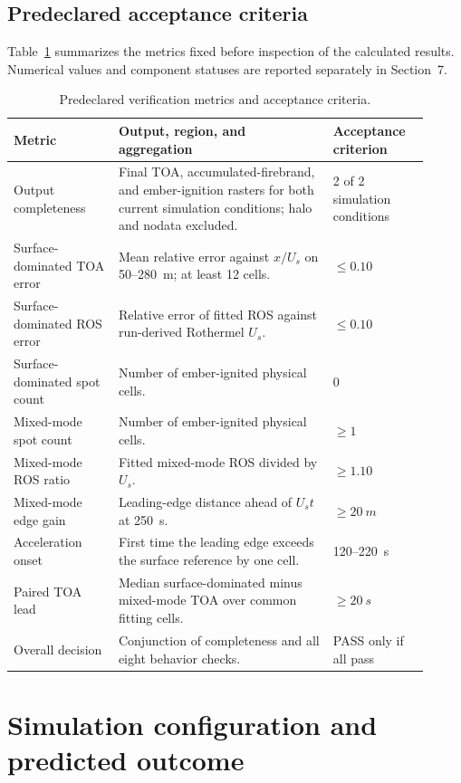 \subsection{Predeclared acceptance criteria}

Table~\ref{tab:acceptance-contract} summarizes the metrics fixed before
inspection of the calculated results. Numerical values and component statuses
are reported separately in Section~7.

\begin{table}[H]
\centering
\footnotesize
\caption{Predeclared verification metrics and acceptance criteria.}
\label{tab:acceptance-contract}
\begin{tabular}{@{}p{0.23\linewidth}p{0.47\linewidth}p{0.21\linewidth}@{}}
\toprule
Metric & Output, region, and aggregation & Acceptance criterion\\
\midrule
Output completeness & Final TOA, accumulated-firebrand, and ember-ignition rasters for both current simulation conditions; halo and nodata excluded. & 2 of 2 simulation conditions \\
Surface-dominated TOA error & Mean relative error against \(x/U_s\) on 50--\SI{280}{m}; at least 12 cells. & \(\le0.10\) \\
Surface-dominated ROS error & Relative error of fitted ROS against run-derived Rothermel \(U_s\). & \(\le0.10\) \\
Surface-dominated spot count & Number of ember-ignited physical cells. & 0 \\
Mixed-mode spot count & Number of ember-ignited physical cells. & \(\ge1\) \\
Mixed-mode ROS ratio & Fitted mixed-mode ROS divided by \(U_s\). & \(\ge1.10\) \\
Mixed-mode edge gain & Leading-edge distance ahead of \(U_st\) at \SI{250}{s}. & \(\ge\SI{20}{m}\) \\
Acceleration onset & First time the leading edge exceeds the surface reference by one cell. & 120--\SI{220}{s} \\
Paired TOA lead & Median surface-dominated minus mixed-mode TOA over common fitting cells. & \(\ge\SI{20}{s}\) \\
Overall decision & Conjunction of completeness and all eight behavior checks. & PASS only if all pass \\
\bottomrule
\end{tabular}
\end{table}

\section{Simulation configuration and predicted outcome}

